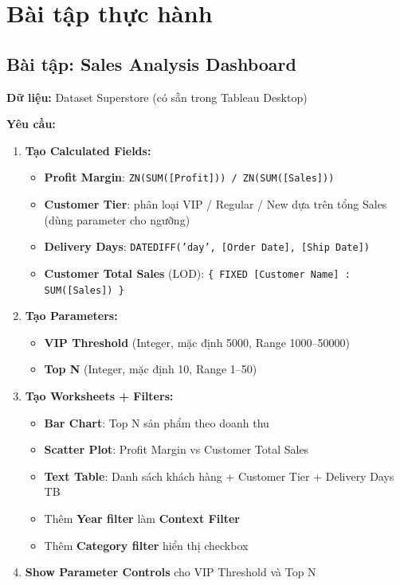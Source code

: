 \documentclass[12pt]{article}
\begin{document}
\section{Bài tập thực hành}
\label{section:exercise}

\subsection{Bài tập: Sales Analysis Dashboard}

\noindent \textbf{Dữ liệu:} Dataset Superstore (có sẵn trong Tableau Desktop)

\noindent \textbf{Yêu cầu:}

\begin{enumerate}
    \item \textbf{Tạo Calculated Fields:}
    \begin{itemize}[nosep]
        \item \textbf{Profit Margin}: \texttt{ZN(SUM([Profit])) / ZN(SUM([Sales]))}
        \item \textbf{Customer Tier}: phân loại VIP / Regular / New dựa trên tổng Sales (dùng parameter cho ngưỡng)
        \item \textbf{Delivery Days}: \texttt{DATEDIFF('day', [Order Date], [Ship Date])}
        \item \textbf{Customer Total Sales} (LOD): \texttt{\{ FIXED [Customer Name] : SUM([Sales]) \}}
    \end{itemize}

    \item \textbf{Tạo Parameters:}
    \begin{itemize}[nosep]
        \item \textbf{VIP Threshold} (Integer, mặc định 5000, Range 1000--50000)
        \item \textbf{Top N} (Integer, mặc định 10, Range 1--50)
    \end{itemize}

    \item \textbf{Tạo Worksheets + Filters:}
    \begin{itemize}[nosep]
        \item \textbf{Bar Chart}: Top N sản phẩm theo doanh thu
        \item \textbf{Scatter Plot}: Profit Margin vs Customer Total Sales
        \item \textbf{Text Table}: Danh sách khách hàng + Customer Tier + Delivery Days TB
        \item Thêm \textbf{Year filter} làm \textbf{Context Filter}
        \item Thêm \textbf{Category filter} hiển thị checkbox
    \end{itemize}

    \item \textbf{Show Parameter Controls} cho VIP Threshold và Top N
\end{enumerate}
\end{document}
